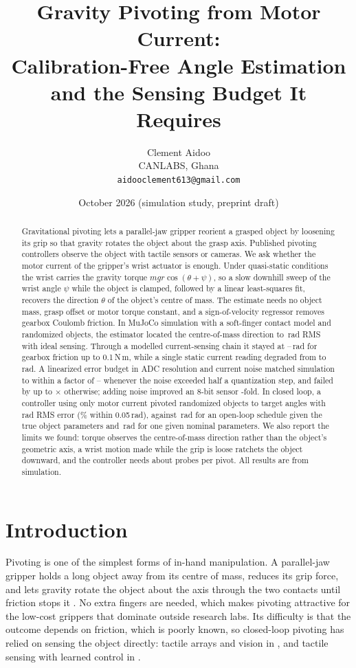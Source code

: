 \documentclass[11pt]{article}
\title{Gravity Pivoting from Motor Current:\\ Calibration-Free Angle Estimation and the Sensing Budget It Requires}
\author{Clement Aidoo\\ CANLABS, Ghana\\ \texttt{aidooclement613@gmail.com}}
\date{October 2026 \quad (simulation study, preprint draft)}
\begin{document}
\maketitle

\begin{abstract}
Gravitational pivoting lets a parallel-jaw gripper reorient a grasped object by loosening its grip so that gravity rotates the object about the grasp axis. Published pivoting controllers observe the object with tactile sensors or cameras. We ask whether the motor current of the gripper's wrist actuator is enough. Under quasi-static conditions the wrist carries the gravity torque $mgr\cos(\theta+\psi)$, so a slow downhill sweep of the wrist angle $\psi$ while the object is clamped, followed by a linear least-squares fit, recovers the direction $\theta$ of the object's centre of mass. The estimate needs no object mass, grasp offset or motor torque constant, and a sign-of-velocity regressor removes gearbox Coulomb friction. In MuJoCo simulation with a soft-finger contact model and \An{} randomized objects, the estimator located the centre-of-mass direction to \AlsRms{}\,rad RMS with ideal sensing. Through a modelled current-sensing chain it stayed at \BsweepLo{}--\BsweepHi{}\,rad for gearbox friction up to 0.1\,N\,m, while a single static current reading degraded from \BnaiveZero{} to \BnaiveMax{}\,rad. A linearized error budget in ADC resolution and current noise matched simulation to within a factor of \BratLo{}--\BratHi{} whenever the noise exceeded half a quantization step, and failed by up to \BuHi{}$\times$ otherwise; adding noise improved an 8-bit sensor \BditherGain{}-fold. In closed loop, a controller using only motor current pivoted \Cn{} randomized objects to target angles with \CCcRms{}\,rad RMS error (\CCcFive\% within 0.05\,rad), against \COoRms{}\,rad for an open-loop schedule given the true object parameters and \COnRms{}\,rad for one given nominal parameters. We also report the limits we found: torque observes the centre-of-mass direction rather than the object's geometric axis, a wrist motion made while the grip is loose ratchets the object downward, and the controller needs about \CCcProbes{} probes per pivot. All results are from simulation.
\end{abstract}

\section{Introduction}
Pivoting is one of the simplest forms of in-hand manipulation. A parallel-jaw gripper holds a long object away from its centre of mass, reduces its grip force, and lets gravity rotate the object about the axis through the two contacts until friction stops it \cite{holladay2015,vina2016,toskov2023}. No extra fingers are needed, which makes pivoting attractive for the low-cost grippers that dominate outside research labs. Its difficulty is that the outcome depends on friction, which is poorly known, so closed-loop pivoting has relied on sensing the object directly: tactile arrays and vision in \cite{vina2016}, and tactile sensing with learned control in \cite{toskov2023}.
\end{document}
